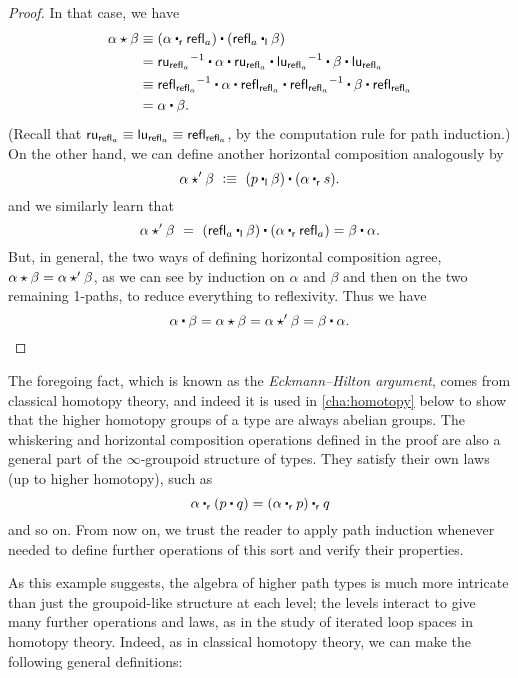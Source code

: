 \begin{proof}
In that case, we have
\begin{align*}
  \alpha\hct\beta
  &\jdeq (\alpha\rightwhisker\refl{a}) \ct (\refl{a}\leftwhisker \beta)\\
  &= \opp{\mathsf{ru}_{\refl{a}}} \ct \alpha \ct \mathsf{ru}_{\refl{a}} \ct \opp{\mathsf{lu}_{\refl a}} \ct \beta \ct \mathsf{lu}_{\refl{a}}\\
  &\jdeq \opp{\refl{\refl{a}}} \ct \alpha \ct \refl{\refl{a}} \ct \opp{\refl{\refl a}} \ct \beta \ct \refl{\refl{a}}\\
  &= \alpha \ct \beta.
\end{align*}
(Recall that $\mathsf{ru}_{\mathsf{refl}_{a}} \equiv \mathsf{lu}_{\mathsf{refl}_{a}} \equiv \mathsf{refl}_{\mathsf{refl}_{a}}$, by the computation rule for path induction.)
On the other hand, we can define another horizontal composition analogously by
\[
\alpha\hct'\beta\ \defeq\ (p\leftwhisker \beta)\ct (\alpha\rightwhisker s).
\]
and we similarly learn that
\[
\alpha\hct'\beta\ =\ (\refl{a}\leftwhisker \beta)\ct (\alpha\rightwhisker \refl{a}) = \beta\ct\alpha.
\]
%
But, in general, the two ways of defining horizontal composition agree, $\alpha\star\beta = \alpha\star'\beta$, as we can see by induction on $\alpha$ and $\beta$ and then on the two remaining 1-paths, to reduce everything to reflexivity.
Thus we have
\[\alpha \ct \beta = \alpha\hct\beta = \alpha\hct'\beta = \beta\ct\alpha.
\qedhere
\]
\end{proof}

The foregoing fact, which is known as the \emph{Eckmann--Hilton argument}, comes from classical homotopy theory, and indeed it is used in \autoref{cha:homotopy} below to show that the higher homotopy groups of a type are always abelian groups.
The whiskering and horizontal composition operations defined in the proof are also a general part of the $\infty$-groupoid structure of types.
They satisfy their own laws (up to higher homotopy), such as
\[ \alpha \rightwhisker (p\ct q) = (\alpha \rightwhisker p) \rightwhisker q \]
and so on.
From now on, we trust the reader to apply path induction whenever needed to define further operations of this sort and verify their properties.

As this example suggests, the algebra of higher path types is much more intricate than just the groupoid-like structure at each level; the levels interact to give many further operations and laws, as in the study of iterated loop spaces in homotopy theory.
Indeed, as in classical homotopy theory, we can make the following general definitions:

